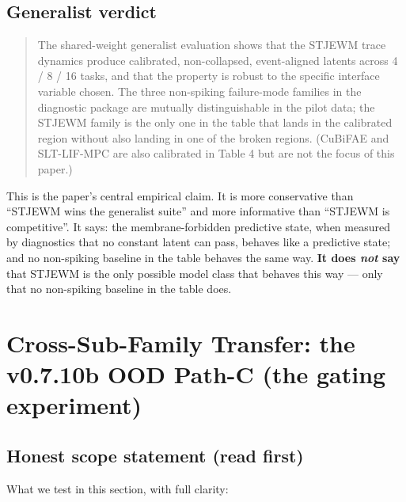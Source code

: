 \documentclass{article}
\begin{document}
\subsection{Generalist verdict}

\begin{quote}
The shared-weight generalist evaluation shows that the STJEWM trace
dynamics produce calibrated, non-collapsed, event-aligned latents
across 4 / 8 / 16 tasks, and that the property is robust to the
specific interface variable chosen. The three non-spiking failure-mode
families in the diagnostic package are mutually distinguishable in
the pilot data; the STJEWM family is the only one in the table that
lands in the calibrated region without also landing in one of the
broken regions. (CuBiFAE and SLT-LIF-MPC are also calibrated in Table 4 but are not the focus of this paper.)
\end{quote}

This is the paper's central empirical claim. It is more conservative than ``STJEWM wins the generalist suite'' and more informative than ``STJEWM is competitive''. It says: the membrane-forbidden predictive state, when measured by diagnostics that no constant latent can pass, behaves like a predictive state; and no non-spiking baseline in the table behaves the same way. \textbf{It does \emph{not} say} that STJEWM is the only possible model class that behaves this way --- only that no non-spiking baseline in the table does.

\section{Cross-Sub-Family Transfer: the v0.7.10b OOD Path-C (the gating experiment)}

\subsection{Honest scope statement (read first)}

What we test in this section, with full clarity:
\end{document}
